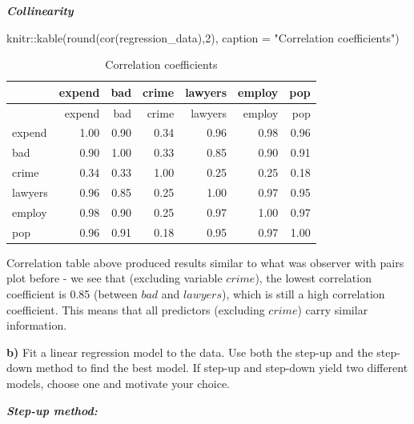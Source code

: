 \documentclass[
  10pt,
]{article}
\newenvironment{Shaded}{\begin{snugshade}}{\end{snugshade}}
\newcommand{\AttributeTok}[1]{\textcolor[rgb]{0.77,0.63,0.00}{#1}}
\newcommand{\DecValTok}[1]{\textcolor[rgb]{0.00,0.00,0.81}{#1}}
\newcommand{\FunctionTok}[1]{\textcolor[rgb]{0.00,0.00,0.00}{#1}}
\newcommand{\NormalTok}[1]{#1}
\newcommand{\SpecialCharTok}[1]{\textcolor[rgb]{0.00,0.00,0.00}{#1}}
\newcommand{\StringTok}[1]{\textcolor[rgb]{0.31,0.60,0.02}{#1}}
\begin{document}
\textbf{\emph{Collinearity}}

\begin{Shaded}
\begin{Highlighting}[]
\NormalTok{knitr}\SpecialCharTok{::}\FunctionTok{kable}\NormalTok{(}\FunctionTok{round}\NormalTok{(}\FunctionTok{cor}\NormalTok{(regression\_data),}\DecValTok{2}\NormalTok{), }\AttributeTok{caption =} \StringTok{"Correlation coefficients"}\NormalTok{)}
\end{Highlighting}
\end{Shaded}

\begin{longtable}[]{@{}lrrrrrr@{}}
\caption{Correlation coefficients}\tabularnewline
\toprule
& expend & bad & crime & lawyers & employ & pop\tabularnewline
\midrule
\endfirsthead
\toprule
& expend & bad & crime & lawyers & employ & pop\tabularnewline
\midrule
\endhead
expend & 1.00 & 0.90 & 0.34 & 0.96 & 0.98 & 0.96\tabularnewline
bad & 0.90 & 1.00 & 0.33 & 0.85 & 0.90 & 0.91\tabularnewline
crime & 0.34 & 0.33 & 1.00 & 0.25 & 0.25 & 0.18\tabularnewline
lawyers & 0.96 & 0.85 & 0.25 & 1.00 & 0.97 & 0.95\tabularnewline
employ & 0.98 & 0.90 & 0.25 & 0.97 & 1.00 & 0.97\tabularnewline
pop & 0.96 & 0.91 & 0.18 & 0.95 & 0.97 & 1.00\tabularnewline
\bottomrule
\end{longtable}

Correlation table above produced results similar to what was observer
with pairs plot before - we see that (excluding variable \(crime\)), the
lowest correlation coefficient is 0.85 (between \(bad\) and
\(lawyers\)), which is still a high correlation coefficient. This means
that all predictors (excluding \(crime\)) carry similar information.

\textbf{b)} Fit a linear regression model to the data. Use both the
step-up and the step-down method to find the best model. If step-up and
step-down yield two different models, choose one and motivate your
choice.

\textbf{\emph{Step-up method:}}
\end{document}

